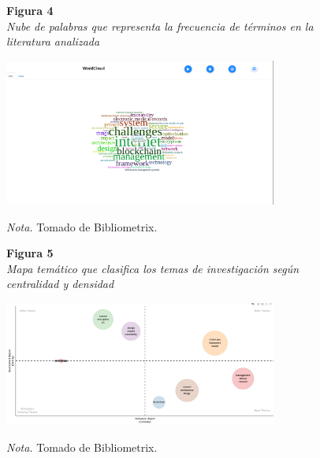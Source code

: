 \begin{figure}[htbp]
    \begin{flushleft}
        \textbf{Figura 4}\\
        \textit{Nube de palabras que representa la frecuencia de términos en la literatura analizada}
    \end{flushleft}
    \centering
    \includegraphics[width=0.8\textwidth]{Images/NubePalabras.png}
    \vspace{0.5em}
    \begin{flushleft}
        \textit{Nota.} Tomado de Bibliometrix.
    \end{flushleft}
    \label{fig:nube_palabras}
\end{figure}

\begin{figure}[htbp]
    \begin{flushleft}
        \textbf{Figura 5}\\
        \textit{Mapa temático que clasifica los temas de investigación según centralidad y densidad}
    \end{flushleft}
    \centering
    \includegraphics[width=0.8\textwidth]{Images/MapaTematico.jpeg}
    \vspace{0.5em}
    \begin{flushleft}
        \textit{Nota.} Tomado de Bibliometrix.
    \end{flushleft}
    \label{fig:mapa_tematico}
\end{figure}

